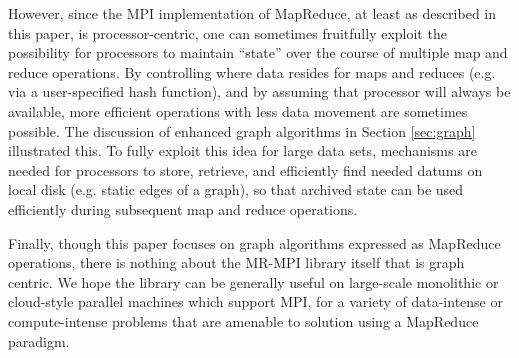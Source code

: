 However, since the MPI implementation of MapReduce, at least as
described in this paper, is processor-centric, one can sometimes
fruitfully exploit the possibility for processors to maintain
``state'' over the course of multiple map and reduce operations.  By
controlling where data resides for maps and reduces (e.g. via a
user-specified hash function), and by assuming that processor will
always be available, more efficient operations with less data movement
are sometimes possible.  The discussion of enhanced graph algorithms
in Section \ref{sec:graph} illustrated this.  To fully exploit this
idea for large data sets, mechanisms are needed for processors to
store, retrieve, and efficiently find needed datums on local disk
(e.g. static edges of a graph), so that archived state can be used
efficiently during subsequent map and reduce operations.

Finally, though this paper focuses on graph algorithms expressed as
MapReduce operations, there is nothing about the MR-MPI library itself
that is graph centric.  We hope the library can be generally useful on
large-scale monolithic or cloud-style parallel machines which support
MPI, for a variety of data-intense or compute-intense problems that
are amenable to solution using a MapReduce paradigm.
